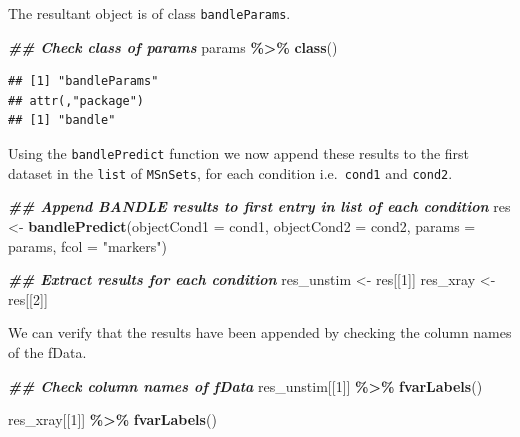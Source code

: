 \documentclass[9pt,a4paper,]{extarticle}
\newenvironment{Shaded}{\begin{snugshade}}{\end{snugshade}}
\newcommand{\AttributeTok}[1]{\textcolor[rgb]{0.13,0.29,0.53}{#1}}
\newcommand{\DecValTok}[1]{\textcolor[rgb]{0.00,0.00,0.81}{#1}}
\newcommand{\DocumentationTok}[1]{\textcolor[rgb]{0.56,0.35,0.01}{\textbf{\textit{#1}}}}
\newcommand{\FunctionTok}[1]{\textcolor[rgb]{0.13,0.29,0.53}{\textbf{#1}}}
\newcommand{\NormalTok}[1]{#1}
\newcommand{\OtherTok}[1]{\textcolor[rgb]{0.56,0.35,0.01}{#1}}
\newcommand{\SpecialCharTok}[1]{\textcolor[rgb]{0.81,0.36,0.00}{\textbf{#1}}}
\newcommand{\StringTok}[1]{\textcolor[rgb]{0.31,0.60,0.02}{#1}}
\begin{document}
The resultant object is of class \texttt{bandleParams}.

\begin{Shaded}
\begin{Highlighting}[]
\DocumentationTok{\#\# Check class of params}
\NormalTok{params }\SpecialCharTok{\%\textgreater{}\%} 
  \FunctionTok{class}\NormalTok{()}
\end{Highlighting}
\end{Shaded}

\begin{verbatim}
## [1] "bandleParams"
## attr(,"package")
## [1] "bandle"
\end{verbatim}

Using the \texttt{bandlePredict} function we now append these results to the first
dataset in the \texttt{list} of \texttt{MSnSets}, for each condition i.e.~\texttt{cond1} and \texttt{cond2}.

\begin{Shaded}
\begin{Highlighting}[]
\DocumentationTok{\#\# Append BANDLE results to first entry in list of each condition}
\NormalTok{res }\OtherTok{\textless{}{-}} \FunctionTok{bandlePredict}\NormalTok{(}\AttributeTok{objectCond1 =}\NormalTok{ cond1, }
                     \AttributeTok{objectCond2 =}\NormalTok{ cond2, }
                     \AttributeTok{params =}\NormalTok{ params, }
                     \AttributeTok{fcol =} \StringTok{"markers"}\NormalTok{)}

\DocumentationTok{\#\# Extract results for each condition}
\NormalTok{res\_unstim }\OtherTok{\textless{}{-}}\NormalTok{ res[[}\DecValTok{1}\NormalTok{]]}
\NormalTok{res\_xray }\OtherTok{\textless{}{-}}\NormalTok{ res[[}\DecValTok{2}\NormalTok{]]}
\end{Highlighting}
\end{Shaded}

We can verify that the results have been appended by checking the column names
of the fData.

\begin{Shaded}
\begin{Highlighting}[]
\DocumentationTok{\#\# Check column names of fData}
\NormalTok{res\_unstim[[}\DecValTok{1}\NormalTok{]] }\SpecialCharTok{\%\textgreater{}\%} 
  \FunctionTok{fvarLabels}\NormalTok{()}
\end{Highlighting}
\end{Shaded}

\begin{Shaded}
\begin{Highlighting}[]
\NormalTok{res\_xray[[}\DecValTok{1}\NormalTok{]] }\SpecialCharTok{\%\textgreater{}\%} 
  \FunctionTok{fvarLabels}\NormalTok{()}
\end{Highlighting}
\end{Shaded}
\end{document}
